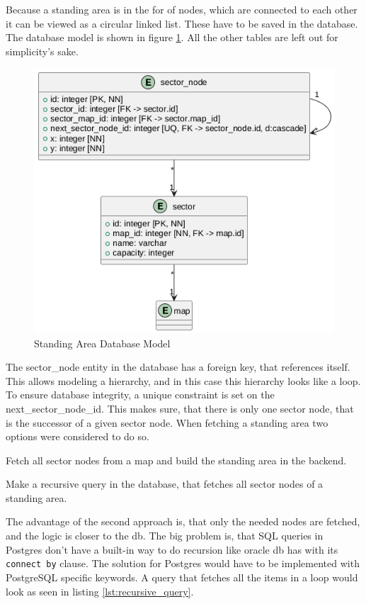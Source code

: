 Because a standing area is in the for of nodes, which are connected to each other it can be viewed as a circular linked list. These have to be saved in the database. The database model is shown in figure \ref{fig:standing_area_db_model}. All the other tables are left out for simplicity's sake.

\begin{figure}
    \centering
    \includegraphics[scale=0.5]{pics/standing-area-db.png}
    \caption{Standing Area Database Model}
    \label{fig:standing_area_db_model}
\end{figure}

The sector\_node entity in the database has a foreign key, that references itself. This allows modeling a hierarchy, and in this case this hierarchy looks like a loop. To ensure database integrity, a unique constraint is set on the next\_sector\_node\_id. This makes sure, that there is only one sector node, that is the successor of a given sector node. When fetching a standing area two options were considered to do so.

\begin{compactenum}
\item Fetch all sector nodes from a map and build the standing area in the backend.
\item Make a recursive query in the database, that fetches all sector nodes of a standing area.
\end{compactenum}

The advantage of the second approach is, that only the needed nodes are fetched, and the logic is closer to the db. The big problem is, that SQL queries in Postgres don't have  a built-in way to do recursion like oracle db has with its \texttt{connect by} clause. The solution for Postgres would have to be implemented with PostgreSQL specific keywords. A query that fetches all the items in a loop would look as seen in listing \ref{lst:recursive_query}. 

